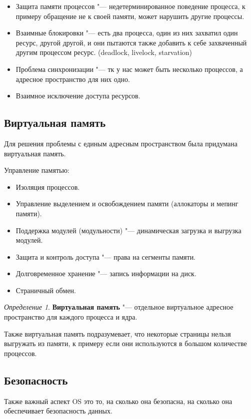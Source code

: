 \documentclass[bachelor, och, pract]{SCWorks}
\theoremstyle{remark}
\newtheorem{definition}{Определение}
\begin{document}
    \begin{itemize}[label=$\bullet$]
        \item Защита памяти процессов "--- недетерминированное поведение процесса, к примеру обращение не к своей памяти, может нарушить другие процессы.
        \item Взаимные блокировки "--- есть два процесса, один из них захватил один ресурс, другой другой, и они пытаются также добавить к себе захваченный другим процессом ресурс. (deadlock, livelock, starvation)
        \item Проблема синхронизации "--- тк у нас может быть несколько процессов, а адресное пространство для них одно.
        \item Взаимное исключение доступа ресурсов.
    \end{itemize}

    \subsection{Виртуальная память}
    Для решения проблемы с единым адресным пространством была придумана виртуальная память.

    Управление памятью: 
    \begin{itemize}[label=$\bullet$]
        \item Изоляция процессов.
        \item Управление выделением и освобождением памяти (аллокаторы и мепинг памяти).
        \item Поддержка модулей (модульности) "--- динамическая загрузка и выгрузка модулей.
        \item Защита и контроль доступа "--- права на сегменты памяти.
        \item Долговременное хранение "--- запись информации на диск.
        \item Страничный обмен. 
    \end{itemize}

    \begin{definition}
        \textbf{Виртуальная память} "--- отдельное виртуальное адресное пространство для каждого процесса и ядра.
    \end{definition}

    Также виртуальная память подразумевает, что некоторые страницы нельзя выгружать из памяти, к примеру если они используются в большом количестве процессов.
    
    \subsection{Безопасность}
    Также важный аспект OS это то, на сколько она безопасна, на сколько она обеспечивает безопасность данных.
\end{document}
